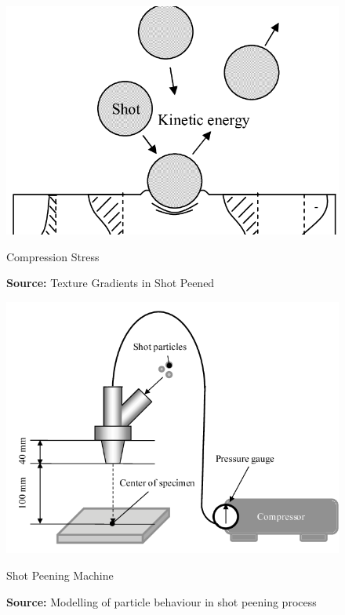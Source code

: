 \begin{figure}[h]
  \centering
  \begin{minipage}[b]{0.4\textwidth}
    \includegraphics[width=\textwidth]{./Images/sp1.png}
    \caption{Compression Stress}
    \label{grinder1}
    \caption*{\textbf{Source:} Texture Gradients in Shot Peened \cite{maawad2010texture}}
  \end{minipage}
  \hfill
  \begin{minipage}[b]{0.4\textwidth}
    \includegraphics[width=\textwidth]{./Images/sp.png}
    \caption{Shot Peening Machine}
    \label{grinder2}
    \caption*{\textbf{Source:} Modelling  of  particle  behaviour  in  shot  peening  process \cite{kato2014modelling}}
  \end{minipage}
\end{figure}

